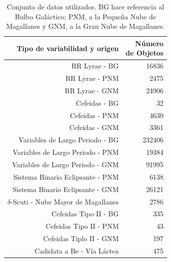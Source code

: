 \documentclass{beamer}
\begin{document}
\begin{frame}
\begin{table}
  \centering  
  \resizebox{0.6\textwidth}{!} {
    \begin{tabular}{rr}
      \hline
      \hline
      Tipo de variabilidad y origen & \shortstack{Número \\de Objetos}\\
      \hline
      \hline 
      RR Lyrae - BG\cite{soszynski_optical_2011-2} & 16836\\
      RR Lyrae - PNM \cite{soszynski_optical_2010}& 2475\\
      RR Lyrae - GNM \cite{soszynski_optical_2009-1}& 24906\\
      \hline
      Cefeidas - BG \cite{soszynski_optical_2011}& 32\\%
      Cefeidas - PNM \cite{soszynski_optical_2010-2}& 4630\\
      Cefeidas - GNM \cite{soszynski_optical_2008-1}& 3361\\
      \hline
      Variables de Largo Periodo - BG \cite{soszynski_optical_2013-1}& 232406\\
      Variables de Largo Periodo - PNM \cite{soszynski_optical_2011-1}& 19384\\
      Variables de Largo Periodo - GNM \cite{soszynski_optical_2009}& 91995\\
      \hline
      Sistema Binario Eclipsante - PNM \cite{pawlak_eclipsing_2013}& 6138\\
      Sistema Binario Eclipsante - GNM \cite{graczyk_optical_2011}& 26121\\
      \hline
      $\delta$-Scuti - Nube Mayor de Magallanes\cite{poleski_optical_2010} & 2786\\
      \hline
      Cefeidas Tipo II - BG \cite{soszynski_optical_2013}& 335\\
      Cefeidas Tipo II - PNM \cite{soszynski_optical_2010-1}& 43\\
      Cefeidas Tiplo II - GNM \cite{soszynski_optical_2008}& 197\\
      \hline
      Cadidata a Be -  Vía Láctea  & 475\\
      \hline
      \hline 
    \end{tabular}
  } 
  \caption{Conjunto de datos utilizados. BG hace referencia al Bulbo Galáctico; PNM, a la Pequeña Nube de Magallanes y GNM, a la Gran Nube de Magallanes. }
  \label{cuadro:datosUsados}
\end{table}

\end{frame}
\end{document}
